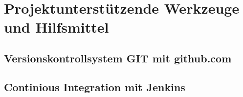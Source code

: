 \section{Projektunterstützende Werkzeuge und Hilfsmittel}

\subsection{Versionskontrollsystem GIT mit github.com}

\subsection{Continious Integration mit Jenkins}

